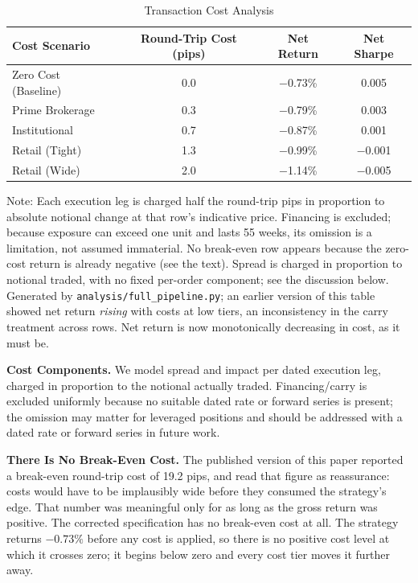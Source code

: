 \documentclass[11pt]{article}
\begin{document}
\begin{table}[H]
\centering
\caption{Transaction Cost Analysis}
\label{tab:tcosts}
\small
\begin{tabular}{@{}lccc@{}}
\toprule
Cost Scenario & Round-Trip Cost (pips) & Net Return & Net Sharpe \\
\midrule
Zero Cost (Baseline) & 0.0 & $-$0.73\% & 0.005 \\
Prime Brokerage & 0.3 & $-$0.79\% & 0.003 \\
Institutional & 0.7 & $-$0.87\% & 0.001 \\
Retail (Tight) & 1.3 & $-$0.99\% & $-$0.001 \\
Retail (Wide) & 2.0 & $-$1.14\% & $-$0.005 \\
\bottomrule
\end{tabular}
\par\vspace{0.3em}
\parbox{\linewidth}{\footnotesize Note: Each execution leg is charged half the round-trip pips in proportion to absolute notional change at that row's indicative price. Financing is excluded; because exposure can exceed one unit and lasts 55 weeks, its omission is a limitation, not assumed immaterial. No break-even row appears because the zero-cost return is already negative (see the text). Spread is charged in proportion to notional traded, with no fixed per-order component; see the discussion below. Generated by \texttt{analysis/full\_pipeline.py}; an earlier version of this table showed net return \emph{rising} with costs at low tiers, an inconsistency in the carry treatment across rows. Net return is now monotonically decreasing in cost, as it must be.}
\end{table}

\textbf{Cost Components.} We model spread and impact per dated execution leg, charged in proportion to the notional actually traded. Financing/carry is excluded uniformly because no suitable dated rate or forward series is present; the omission may matter for leveraged positions and should be addressed with a dated rate or forward series in future work.

\textbf{There Is No Break-Even Cost.} The published version of this paper reported a break-even round-trip cost of 19.2 pips, and read that figure as reassurance: costs would have to be implausibly wide before they consumed the strategy's edge. That number was meaningful only for as long as the gross return was positive. The corrected specification has no break-even cost at all. The strategy returns $-0.73\%$ before any cost is applied, so there is no positive cost level at which it crosses zero; it begins below zero and every cost tier moves it further away.
\end{document}
